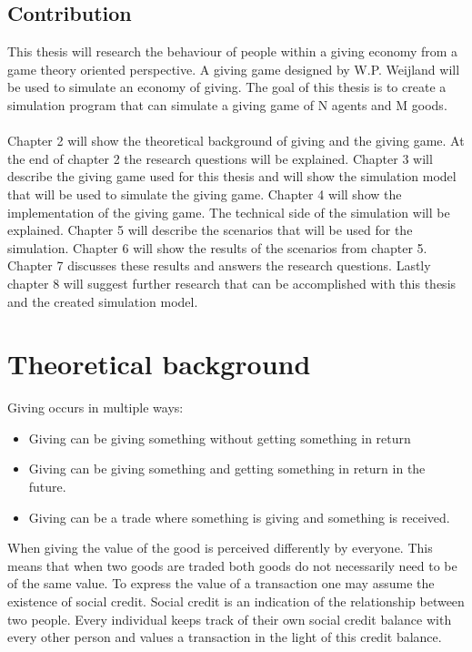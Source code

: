 \documentclass[twoside,openright]{uva-bachelor-thesis}
\begin{document}
\section{Contribution}
This thesis will research the behaviour of people within a giving economy from a game theory oriented perspective. A giving game designed by W.P. Weijland will be used to simulate an economy of giving. The goal of this thesis is to create a simulation program that can simulate a giving game of N agents and M goods. 
\\
\\
Chapter 2 will show the theoretical background of giving and the giving game. At the end of chapter 2 the research questions will be explained. Chapter 3 will describe the giving game used for this thesis and will show the simulation model that will be used to simulate the giving game. Chapter 4 will show the implementation of the giving game. The technical side of the simulation will be explained. Chapter 5 will describe the scenarios that will be used for the simulation. Chapter 6 will show the results of the scenarios from chapter 5. Chapter 7 discusses these results and answers the research questions. Lastly chapter 8 will suggest further research that can be accomplished with this thesis and the created simulation model.




\chapter{Theoretical background}
Giving occurs in multiple ways:
\begin{itemize}
  \item Giving can be giving something without getting something in return
  \item Giving can be giving something and getting something in return in the future.
  \item Giving can be a trade where something is giving and something is received.
\end{itemize}
When giving the value of the good is perceived differently by everyone. This means that when two goods are traded both goods do not necessarily need to be of the same value. To express the value of a transaction one may assume the existence of social credit. Social credit is an indication of the relationship between two people. Every individual keeps track of their own social credit balance with every other person and values a transaction in the light of this credit balance.
\end{document}

